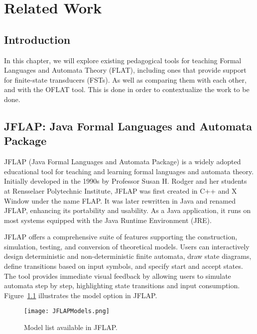 
%

\chapter{Related Work}
\label{cha:related_work}

\section{Introduction}
In this chapter, we will explore existing pedagogical tools for teaching Formal Languages and Automata Theory (FLAT), 
including ones that provide support for finite-state transducers (FSTs). As well as comparing them with each other, and with the OFLAT tool. 
This is done in order to contextualize the work to be done.

\section{JFLAP: Java Formal Languages and Automata Package}

JFLAP (Java Formal Languages and Automata Package)\cite{JFLAP} is a widely adopted educational tool for teaching and learning formal languages and automata theory. 
Initially developed in the 1990s by Professor Susan H. Rodger and her students at Rensselaer Polytechnic Institute, JFLAP was first created in C++ and X Window under the name FLAP. 
It was later rewritten in Java and renamed JFLAP, enhancing its portability and usability. As a Java application, it runs on most systems equipped with the Java Runtime Environment (JRE).

JFLAP offers a comprehensive suite of features supporting the construction, simulation, testing, and conversion of theoretical models. 
Users can interactively design deterministic and non-deterministic finite automata, draw state diagrams, define transitions based on input symbols, and specify start and accept states. 
The tool provides immediate visual feedback by allowing users to simulate automata step by step, highlighting state transitions and input consumption. 
Figure~\ref{fig:JFLAPModels} illustrates the model option in JFLAP.

\begin{figure}[H]
  \centering
  \texttt{[image: JFLAPModels.png]}
  \caption{Model list available in JFLAP.}
  \label{fig:JFLAPModels}
\end{figure}

